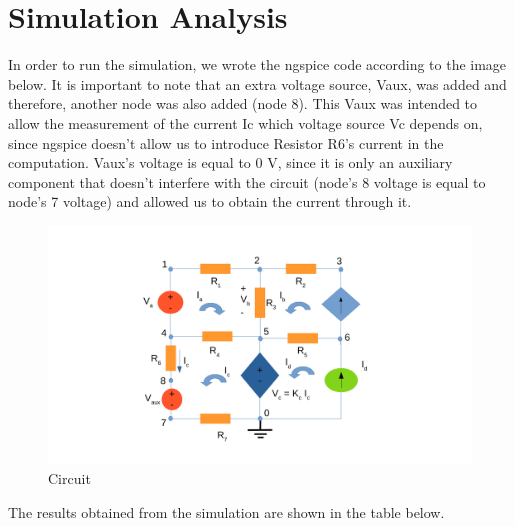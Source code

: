 \section{Simulation Analysis}
\label{sec:simulation}


	In order to run the simulation, we wrote the ngspice code according to the image below. It is important to note that an extra voltage source, Vaux, was added and therefore, another node was also added (node 8). This Vaux was intended to allow the measurement of the current Ic which voltage source Vc depends on, since ngspice doesn't allow us to introduce Resistor R6's current in the computation. Vaux's voltage is equal to 0 V, since it is only an auxiliary component that doesn't interfere with the circuit (node's 8 voltage is equal to node's 7 voltage) and allowed us to obtain the current through it.

\begin{figure}[ht]
\centering
\includegraphics[width = 15cm]{system1.pdf}
\caption {Circuit}
\end{figure}





	The results obtained from the simulation are shown in the table below. 

